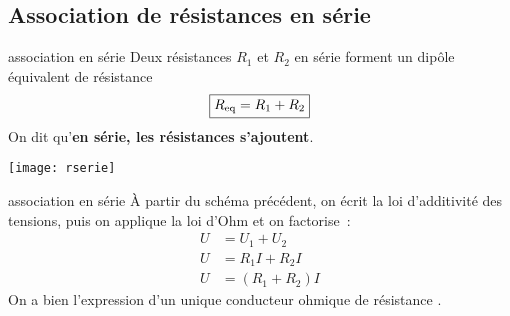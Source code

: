 \documentclass[../main/main.tex]{subfiles}
\begin{document}
\subsection{Association de résistances en série}
\begin{tcbraster}[raster columns=2, raster equal height=rows]
    \begin{prop}[label=prop:rserie]{association en série}
        Deux résistances $R_1$ et $R_2$ en série forment un dipôle équivalent de
        résistance
        \[\boxed{R_{\rm eq} = R_1 + R_2}\]
        On dit qu'\textbf{en série, les résistances s'ajoutent}.
        \tcblower
        \begin{center}
            \texttt{[image: rserie]}
        \end{center}
    \end{prop}
    \begin{demo}[label=demo:rserie]{association en série}
        À partir du schéma précédent, on écrit la loi d'additivité des tensions,
        puis on applique la loi d'Ohm et on factorise~:
        \begin{align*}
            U &= U_1 + U_2\\
            U &= R_1I + R_2I\\
            U &= (R_1 + R_2)I
        \end{align*}
        On a bien l'expression d'un unique conducteur ohmique de résistance
        .
    \end{demo}
\end{tcbraster}
\end{document}
